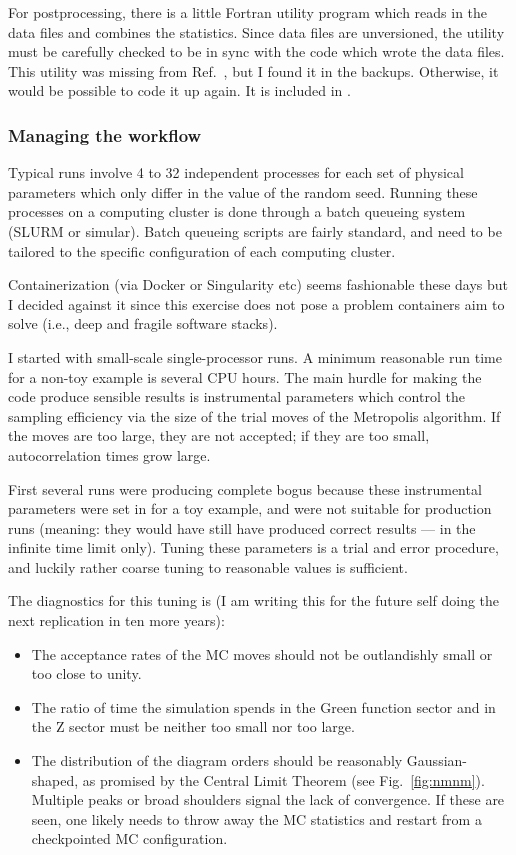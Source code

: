 For postprocessing, there is a little Fortran utility program which reads in
the data files and combines the statistics. Since data files are unversioned,
the utility must be carefully checked to be in sync with the code which wrote
the data files. 
This utility was missing from Ref.\ \cite{MCWA}, but I found it in the backups.
Otherwise, it would be possible to code it up again.  
It is included in \cite{GH:2020}.


\subsubsection{Managing the workflow}

Typical runs involve 4 to 32 independent processes for each set of physical
parameters which only differ in the value of the random seed. Running these
processes on a computing cluster is done through a batch queueing system
(SLURM or simular). Batch queueing scripts are fairly standard, and need to be
tailored to the specific configuration of each computing cluster.

Containerization (via Docker or Singularity etc) seems fashionable these days
but I decided against it since this exercise does not pose a problem containers
aim to solve (i.e., deep and fragile software stacks). 

I started with small-scale single-processor runs. A minimum reasonable run time
for a non-toy example is several CPU hours. The main hurdle for making the code
produce sensible results is instrumental parameters which control the sampling
efficiency via the size of the trial moves of the Metropolis
algorithm. If the moves are too large, they are not accepted; if they are too small,
autocorrelation times grow large. 

First several runs were producing complete bogus
because these instrumental parameters were set in \cite{MCWA} for a toy example,
and were not suitable for production runs (meaning: they would have still
have produced correct results --- in the infinite time limit only). 
Tuning these parameters is a trial and error procedure, and luckily rather coarse
tuning to reasonable values is sufficient. 

The diagnostics for this tuning is (I am writing this for the future self doing
the next replication in ten more years):

\begin{itemize}
\item The acceptance rates of the MC moves should not be outlandishly small or
too close to unity.

\item The ratio of time the simulation spends in the Green function sector and
in the Z sector must be neither too small nor too large.

\item The distribution of the diagram orders should be reasonably Gaussian-shaped,
as promised by the Central Limit Theorem (see Fig.\ \ref{fig:nmnm}).
Multiple peaks or broad shoulders signal the lack of convergence. If these are seen,
one likely needs to throw away the MC statistics and restart from a checkpointed
MC configuration.
\end{itemize}

